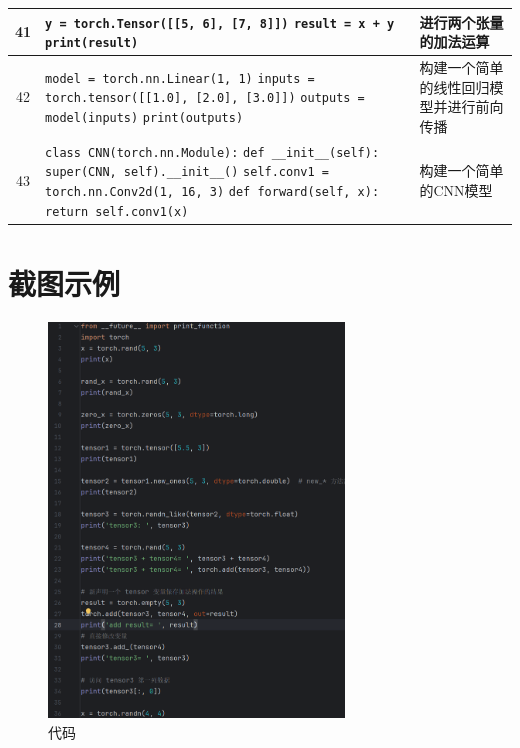 \documentclass{article}
\begin{document}
\begin{longtable}{|c|p{10cm}|l|}
\hline
41 & \verb|y = torch.Tensor([[5, 6], [7, 8]])| \newline \verb|result = x + y| \newline \verb|print(result)| & 进行两个张量的加法运算 \\
\hline
42 & \verb|model = torch.nn.Linear(1, 1)| \newline \verb|inputs = torch.tensor([[1.0], [2.0], [3.0]])| \newline \verb|outputs = model(inputs)| \newline \verb|print(outputs)| & 构建一个简单的线性回归模型并进行前向传播 \\
\hline
43 & \verb|class CNN(torch.nn.Module):| \newline \verb|def __init__(self):| \newline \verb|super(CNN, self).__init__()| \newline \verb|self.conv1 = torch.nn.Conv2d(1, 16, 3)| \newline \verb|def forward(self, x):| \newline \verb|return self.conv1(x)| & 构建一个简单的CNN模型 \\
\hline

\end{longtable}
\section{截图示例}

\begin{figure}[htbp]
\centering
\includegraphics[width=0.7\textwidth]{1.png}
\caption{代码}
\end{figure}
\end{document}
